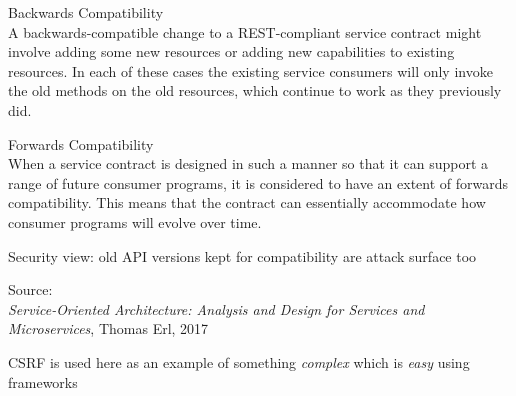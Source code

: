 \documentclass[Screen16to9,17pt]{foils}
\begin{document}
\begin{list2}
\item Backwards Compatibility\\
A backwards-compatible change to a REST-compliant service contract might involve adding some new resources or adding new capabilities to existing resources. In each of these cases the existing service consumers will only invoke the old methods on the old resources, which continue to work as they previously did.
\item Forwards Compatibility\\
When a service contract is designed in such a manner so that it can support a range of future consumer programs, it is considered to have an extent of forwards compatibility. This means that the contract can essentially accommodate how consumer programs will evolve over time.
\item Security view: old API versions kept for compatibility are attack surface too
\end{list2}

Source: {\footnotesize\\
\emph{Service‑Oriented Architecture: Analysis and Design for Services and Microservices}, Thomas Erl, 2017}




CSRF is used here as an example of something \emph{complex} which is \emph{easy} using frameworks
\end{document}
